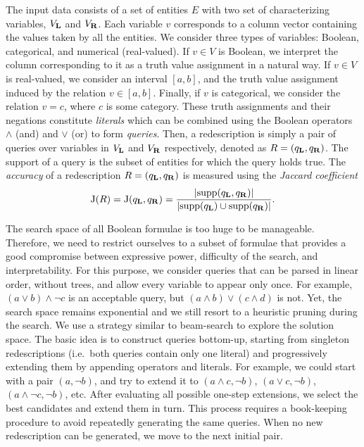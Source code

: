 \documentclass{sig-alternate}
\begin{document}
The input data consists of a set of entities $E$ with two set of
characterizing variables, $V_{\mathbf{L}}$ and $V_{\mathbf{R}}$.  Each variable $v$
corresponds to a column vector containing the values taken by all the
entities.  We consider three types of variables: Boolean, categorical,
and numerical (real-valued).  If $v\in V$ is Boolean, we interpret the
column corresponding to it as a truth value assignment in a natural
way.  If $v\in V$ is real-valued, we consider an interval $[a, b]$,
and the truth value assignment induced by the relation
$v\in[a,b]$. Finally, if $v$ is categorical, we consider the relation
$v=c$, where $c$ is some category.  These truth assignments and their
negations constitute \emph{literals} which can be combined using the
Boolean operators $\land$ (and) and $\lor$ (or) to form
\emph{queries}.  Then, a redescription is simply a pair of queries
over variables in $V_{\mathbf{L}}$ and $V_{\mathbf{R}}$ respectively, denoted as
$R=(q_{\mathbf{L}},q_{\mathbf{R}})$.
The support of a query is the subset of entities for which the query holds true.
The \emph{accuracy} of a redescription $R=(q_{\mathbf{L}},q_{\mathbf{R}})$ is 
measured using the \emph{Jaccard coefficient} 
\[
\jacc(R)= \jacc(q_\iLHS,q_\iRHS) = \frac{\abs{\supp(q_\iLHS,q_\iRHS)}}%
{\abs{\supp(q_\iLHS)\cup\supp(q_\iRHS)}}.
\]

The search space of all Boolean formulae is too huge to be manageable.
Therefore, we need to restrict ourselves to a subset of formulae that
provides a good compromise between expressive power, difficulty of the
search, and interpretability.
For this purpose, we consider queries that can be parsed in linear
order, without trees, and allow every variable to appear only once.
For example, $(a \lor b) \land \lnot c$ is an acceptable query, but
$(a \land b) \lor (c \land d)$ is not. Yet, the search space remains
exponential and we still resort to a heuristic pruning during the
search.  We use a strategy similar to beam-search to explore the
solution space.  The basic idea is to construct queries bottom-up,
starting from singleton redescriptions (i.e.\ both queries contain
only one literal) and progressively extending them by appending
operators and literals.  For example, we could start with a pair $(a,
\lnot b)$, and try to extend it to $(a\land c, \lnot b)$, $(a \lor c,
\lnot b)$, $(a \land \lnot c, \lnot b)$, etc. After evaluating all
possible one-step extensions, we select the best candidates and extend
them in turn. This process requires a book-keeping procedure to avoid
repeatedly generating the same queries.  When no new redescription can
be generated, we move to the next initial pair.  
\end{document}
